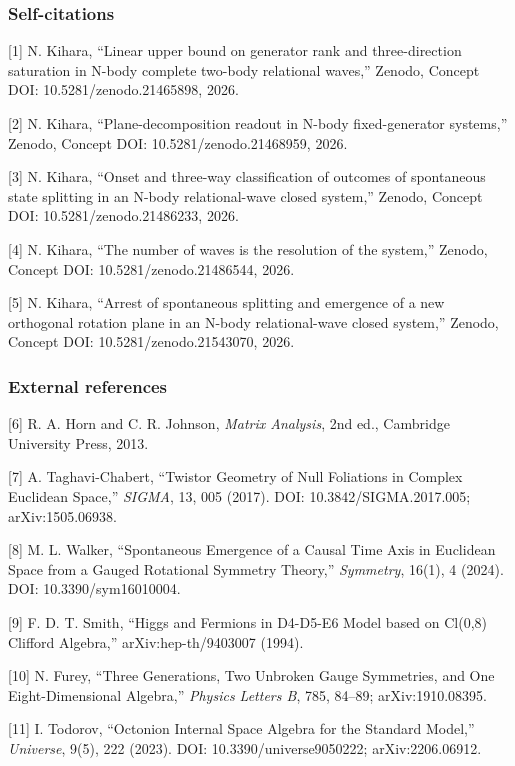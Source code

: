 \documentclass[
  a4paper,
]{article}
\begin{document}
\subsubsection{Self-citations}\label{self-citations}

{[}1{]} N. Kihara, ``Linear upper bound on generator rank and
three-direction saturation in N-body complete two-body relational
waves,'' Zenodo, Concept DOI: 10.5281/zenodo.21465898, 2026.

{[}2{]} N. Kihara, ``Plane-decomposition readout in N-body
fixed-generator systems,'' Zenodo, Concept DOI: 10.5281/zenodo.21468959,
2026.

{[}3{]} N. Kihara, ``Onset and three-way classification of outcomes of
spontaneous state splitting in an N-body relational-wave closed
system,'' Zenodo, Concept DOI: 10.5281/zenodo.21486233, 2026.

{[}4{]} N. Kihara, ``The number of waves is the resolution of the
system,'' Zenodo, Concept DOI: 10.5281/zenodo.21486544, 2026.

{[}5{]} N. Kihara, ``Arrest of spontaneous splitting and emergence of a
new orthogonal rotation plane in an N-body relational-wave closed
system,'' Zenodo, Concept DOI: 10.5281/zenodo.21543070, 2026.

\subsubsection{External references}\label{external-references}

{[}6{]} R. A. Horn and C. R. Johnson, \emph{Matrix Analysis}, 2nd ed.,
Cambridge University Press, 2013.

{[}7{]} A. Taghavi-Chabert, ``Twistor Geometry of Null Foliations in
Complex Euclidean Space,'' \emph{SIGMA}, 13, 005 (2017). DOI:
10.3842/SIGMA.2017.005; arXiv:1505.06938.

{[}8{]} M. L. Walker, ``Spontaneous Emergence of a Causal Time Axis in
Euclidean Space from a Gauged Rotational Symmetry Theory,''
\emph{Symmetry}, 16(1), 4 (2024). DOI: 10.3390/sym16010004.

{[}9{]} F. D. T. Smith, ``Higgs and Fermions in D4-D5-E6 Model based on
Cl(0,8) Clifford Algebra,'' arXiv:hep-th/9403007 (1994).

{[}10{]} N. Furey, ``Three Generations, Two Unbroken Gauge Symmetries,
and One Eight-Dimensional Algebra,'' \emph{Physics Letters B}, 785,
84--89; arXiv:1910.08395.

{[}11{]} I. Todorov, ``Octonion Internal Space Algebra for the Standard
Model,'' \emph{Universe}, 9(5), 222 (2023). DOI:
10.3390/universe9050222; arXiv:2206.06912.
\end{document}
